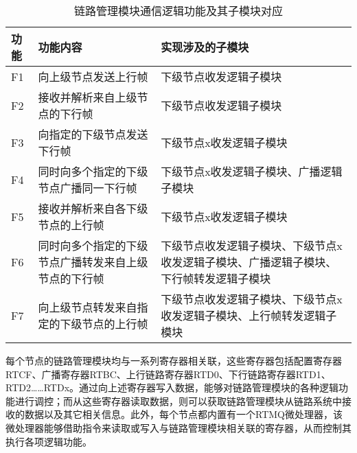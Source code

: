 \begin{table}
    \centering
    \caption[链路管理模块通信逻辑功能及其子模块对应]{链路管理模块通信逻辑功能及其子模块对应\label{tb:rtmq_link_module}}
    \begin{tabular}{C{1.5cm}|C{5.5cm}|C{6cm}}
        \toprule
        功能 & 功能内容 & 实现涉及的子模块\\
        \midrule
        F1 & 向上级节点发送上行帧 & 下级节点收发逻辑子模块\\
        \hline
        F2 & 接收并解析来自上级节点的下行帧 & 下级节点收发逻辑子模块\\
        \hline
        F3 & 向指定的下级节点发送下行帧 & 下级节点x收发逻辑子模块\\
        \hline
        F4 & 同时向多个指定的下级节点广播同一下行帧 & 下级节点x收发逻辑子模块、广播逻辑子模块\\
        \hline
        F5 & 接收并解析来自各下级节点的上行帧 & 下级节点x收发逻辑子模块\\
        \hline
        F6 & 同时向多个指定的下级节点广播转发来自上级节点的下行帧 & 下级节点收发逻辑子模块、下级节点x收发逻辑子模块、广播逻辑子模块、下行帧转发逻辑子模块\\
        \hline
        F7 & 向上级节点转发来自指定的下级节点的上行帧 & 下级节点收发逻辑子模块、下级节点x收发逻辑子模块、上行帧转发逻辑子模块\\
        \bottomrule
    \end{tabular}
\end{table}





每个节点的链路管理模块均与一系列寄存器相关联，这些寄存器包括配置寄存器RTCF、广播寄存器RTBC、上行链路寄存器RTD0、下行链路寄存器RTD1、RTD2……RTDx。通过向上述寄存器写入数据，能够对链路管理模块的各种逻辑功能进行调控；而从这些寄存器读取数据，则可以获取链路管理模块从链路系统中接收的数据以及其它相关信息。此外，每个节点都内置有一个RTMQ微处理器，该微处理器能够借助指令来读取或写入与链路管理模块相关联的寄存器，从而控制其执行各项逻辑功能。


